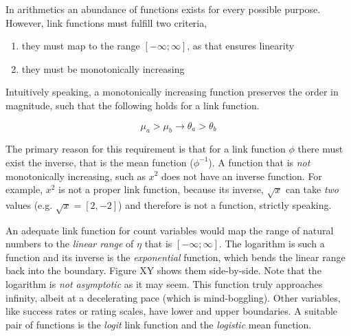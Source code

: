 \documentclass[]{svmono}
\providecommand{\tightlist}{%
  \setlength{\itemsep}{0pt}\setlength{\parskip}{0pt}}
\begin{document}
In arithmetics an abundance of functions exists for every possible
purpose. However, link functions must fulfill two criteria,

\begin{enumerate}
\def\labelenumi{\arabic{enumi}.}
\tightlist
\item
  they must map to the range \([-\infty; \infty]\), as that ensures
  linearity
\item
  they must be monotonically increasing
\end{enumerate}

Intuitively speaking, a monotonically increasing function preserves the
order in magnitude, such that the following holds for a link function.

\[
\mu_a > \mu_b \rightarrow \theta_a > \theta_b
\]

The primary reason for this requirement is that for a link function
\(\phi\) there must exist the inverse, that is the mean function
(\(\phi^{-1}\)). A function that is \emph{not} monotonically increasing,
such as \(x^2\) does not have an inverse function. For example, \(x^2\)
is not a proper link function, because its inverse, \(\sqrt{x}\) can
take \emph{two} values (e.g. \(\sqrt{x} = [2, -2]\)) and therefore is
not a function, strictly speaking.

An adequate link function for count variables would map the range of
natural numbers to the \emph{linear range} of \(\eta\) that is
\([-\infty; \infty]\). The logarithm is such a function and its inverse
is the \emph{exponential} function, which bends the linear range back
into the boundary. Figure XY shows them side-by-side. Note that the
logarithm is \emph{not asymptotic} as it may seem. This function truly
approaches infinity, albeit at a decelerating pace (which is
mind-boggling). Other variables, like success rates or rating scales,
have lower and upper boundaries. A suitable pair of functions is the
\emph{logit} link function and the \emph{logistic} mean function.
\end{document}

